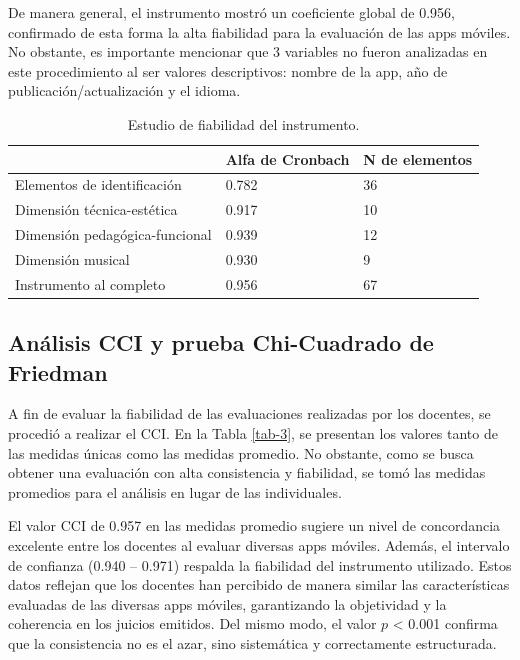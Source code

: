 \documentclass[spanish]{textolivre}
\begin{document}
De manera general, el instrumento mostró un coeficiente global de 0.956, confirmado de esta forma la alta fiabilidad para la evaluación de las apps móviles. No obstante, es importante mencionar que 3 variables no fueron analizadas en este procedimiento al ser valores descriptivos: nombre de la app, año de publicación/actualización y el idioma.

\begin{table}[h!]
  \begin{threeparttable}
\caption{Estudio de fiabilidad del instrumento.}
\label{tab-2}
\centering
\begin{tabular}{p{5cm} p{4cm} p{4cm}}
\toprule
 & Alfa de Cronbach & N de elementos \\
\midrule
Elementos de identificación & 0.782 & 36 \\
Dimensión técnica-estética & 0.917 & 10 \\
Dimensión pedagógica-funcional & 0.939 & 12 \\
Dimensión musical & 0.930 & 9 \\
Instrumento al completo & 0.956 & 67 \\
\bottomrule
\end{tabular}
\end{threeparttable}
\end{table}

\subsection{Análisis CCI y prueba Chi-Cuadrado de Friedman}\label{sec-3_2}
A fin de evaluar la fiabilidad de las evaluaciones realizadas por los docentes, se procedió a realizar el CCI. En la Tabla \ref{tab-3}, se presentan los valores tanto de las medidas únicas como las medidas promedio. No obstante, como se busca obtener una evaluación con alta consistencia y fiabilidad, se tomó las medidas promedios para el análisis en lugar de las individuales.

El valor CCI de 0.957 en las medidas promedio sugiere un nivel de concordancia excelente entre los docentes al evaluar diversas apps móviles. Además, el intervalo de confianza (0.940 – 0.971) respalda la fiabilidad del instrumento utilizado. Estos datos reflejan que los docentes han percibido de manera similar las características evaluadas de las diversas apps móviles, garantizando la objetividad y la coherencia en los juicios emitidos. Del mismo modo, el valor $p$ < 0.001 confirma que la consistencia no es el azar, sino sistemática y correctamente estructurada. 
\end{document}
